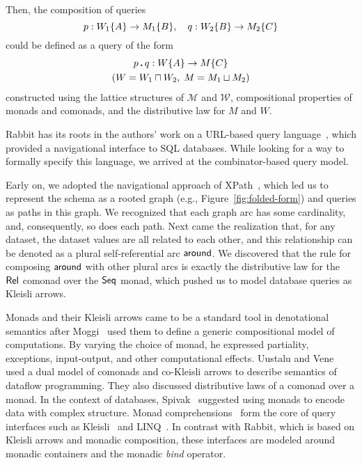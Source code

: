 Then, the composition of queries
\begin{equation*}
    p : W_1{\left\{A\right\}} \to M_1{\left\{B\right\}}, \quad q : W_2{\left\{B\right\}} \to M_2{\left\{C\right\}}
\end{equation*}
could be defined as a query of the form
\begin{multline*}
    p\,\boldsymbol{.}\,q : W{\left\{A\right\}} \to M{\left\{C\right\}} \\ (W = W_1 \sqcap W_2,\; M = M_1 \sqcup M_2)
\end{multline*}
constructed using the lattice structures of $\mathcal{M}$ and $\mathcal{W}$,
compositional properties of monads and comonads, and the distributive law for
$M$ and $W$.

Rabbit has its roots in the authors' work on a URL-based query
language~\cite{Evans2007}, which provided a navigational interface to SQL
databases.  While looking for a way to formally specify this language, we
arrived at the combinator-based query model.

Early on, we adopted the navigational approach of XPath~\cite{Clark1999}, which
led us to represent the schema as a rooted graph (e.g.,
Figure~\ref{fig:folded-form}) and queries as paths in this graph.  We
recognized that each graph arc has some cardinality, and, consequently, so does
each path.  Next came the realization that, for any dataset, the dataset values
are all related to each other, and this relationship can be denoted as a plural
self-referential arc $\mathsf{around}$.  We discovered that the rule for composing
$\mathsf{around}$ with other plural arcs is exactly the distributive law for the
$\mathsf{Rel}$ comonad over the $\mathsf{Seq}$ monad, which pushed us to model
database queries as Kleisli arrows.

Monads and their Kleisli arrows came to be a standard tool in denotational
semantics after Moggi~\cite{Moggi1991} used them to define a generic
compositional model of computations.  By varying the choice of monad, he
expressed partiality, exceptions, input-output, and other computational
effects.  Uustalu and Vene~\cite{Uustalu2005} used a dual model of comonads and
co-Kleisli arrows to describe semantics of dataflow programming.  They also
discussed distributive laws of a comonad over a monad.  In the context of
databases, Spivak~\cite{Spivak2012} suggested using monads to encode data with
complex structure.  Monad comprehensions~\cite{Trinder1989, Buneman1994} form
the core of query interfaces such as Kleisli~\cite{Wong2000} and
LINQ~\cite{Meijer2006}.  In contrast with Rabbit, which is based on Kleisli
arrows and monadic composition, these interfaces are modeled around monadic
containers and the monadic \emph{bind} operator.


